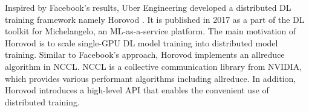 Inspired by Facebook's results, Uber Engineering developed a distributed DL
training framework namely Horovod \cite{sergeev2018horovod}. It is published in
2017 as a part of the DL toolkit for Michelangelo, an ML-as-a-service platform.
The main motivation of Horovod is to scale single-GPU DL model training
into distributed model training. Similar to Facebook's approach,
Horovod implements an allreduce algorithm in NCCL. NCCL is a collective communication
library from NVIDIA, which provides various performant algorithms including
allreduce. In addition, Horovod introduces a high-level API that enables
the convenient use of distributed training.  

